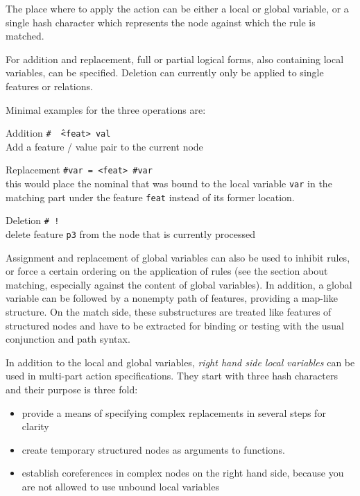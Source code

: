 \documentclass[11pt,a4paper]{article}
\newcommand{\cd}[1]{\texttt{#1}}
\begin{document}
The place where to apply the action can be either a local or global variable,
or a single hash character which represents the node against which the rule is
matched.

For addition and replacement, full or partial logical forms, also containing
local variables, can be specified. Deletion can currently only be applied to
single features or relations.
\newpage

Minimal examples for the three operations are:
\begin{list}{}{\setlength{\leftmargin}{3.2cm}\setlength{\labelwidth}{2.6cm}
\renewcommand{\makelabel}[1]{\textbf{#1}}}
\item[Addition] \cd{\# \^\  <feat> val}\\ Add a feature / value pair to the current
  node
\item[Replacement] \cd{\#var = <feat> \#var}\\ this would place the nominal that
  was bound to the local variable \cd{var} in the matching part under the
  feature \cd{feat} instead of its former location.
\item[Deletion] \cd{\# !\ <p3>}\\ delete feature \cd{p3} from the node that is
  currently processed
\end{list}

Assignment and replacement of global variables can also be used to inhibit
rules, or force a certain ordering on the application of rules (see the
section about matching, especially against the content of global variables).
In addition, a global variable can be followed by a nonempty path of features,
providing a map-like structure. On the match side, these substructures are
treated like features of structured nodes and have to be extracted for binding
or testing with the usual conjunction and path syntax.

In addition to the local and global variables, \emph{right hand side local
  variables} can be used in multi-part action specifications. They start
with three hash characters and their purpose is three fold:
\begin{itemize}
\item provide a means of specifying complex replacements in several steps for
  clarity
\item create temporary structured nodes as arguments to functions.
\item establish coreferences in complex nodes on the right hand side, because
  you are not allowed to use unbound local variables
\end{itemize}
\end{document}
